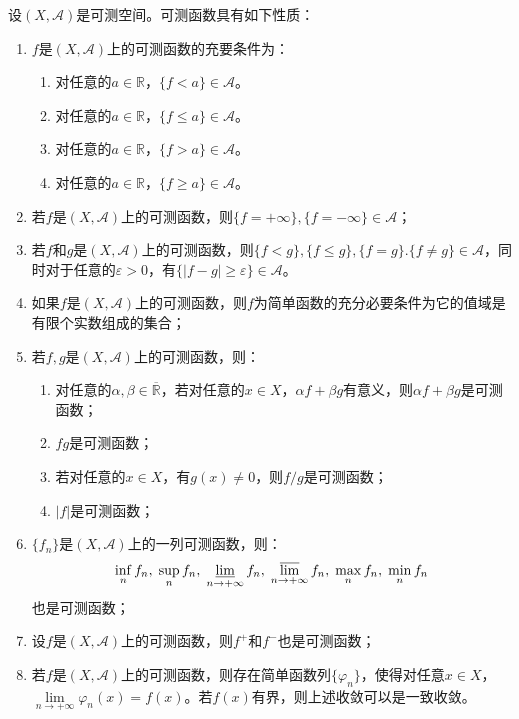 \begin{property}\label{prop:MeasurableFunction}
	设$(X,\mathscr{A})$是可测空间。可测函数具有如下性质：
	\begin{enumerate}
		\item $f$是$(X,\mathscr{A})$上的可测函数的充要条件为：
		\begin{enumerate}
			\item 对任意的$a\in\mathbb{R}$，$\{f<a\}\in\mathscr{A}$。
			\item 对任意的$a\in\mathbb{R}$，$\{f\leqslant a\}\in\mathscr{A}$。
			\item 对任意的$a\in\mathbb{R}$，$\{f>a\}\in\mathscr{A}$。
			\item 对任意的$a\in\mathbb{R}$，$\{f\geqslant a\}\in\mathscr{A}$。
		\end{enumerate}
		\item 若$f$是$(X,\mathscr{A})$上的可测函数，则$\{f=+\infty\},\{f=-\infty\}\in\mathscr{A}$；
		\item 若$f$和$g$是$(X,\mathscr{A})$上的可测函数，则$\{f<g\},\{f\leqslant g\},\{f=g\}.\{f\ne g\}\in\mathscr{A}$，同时对于任意的$\varepsilon>0$，有$\{|f-g|\geqslant\varepsilon\}\in \mathscr{A}$。
		\item 如果$f$是$(X,\mathscr{A})$上的可测函数，则$f$为简单函数的充分必要条件为它的值域是有限个实数组成的集合；
		\item 若$f,g$是$(X,\mathscr{A})$上的可测函数，则：
		\begin{enumerate}
			\item 对任意的$\alpha,\beta\in\overline{\mathbb{R}}$，若对任意的$x\in X$，$\alpha f+\beta g$有意义，则$\alpha f+\beta g$是可测函数；
			\item $fg$是可测函数；
			\item 若对任意的$x\in X$，有$g(x)\ne0$，则$f/g$是可测函数；
			\item $|f|$是可测函数；
		\end{enumerate}
		\item $\{f_n\}$是$(X,\mathscr{A})$上的一列可测函数，则：
		\begin{equation*}
			\inf_nf_n,\;\sup_nf_n,\;
			\varliminf_{n\to+\infty}f_n,\;\varlimsup_{n\to+\infty}f_n,\;\max_nf_n,\;\min_nf_n
		\end{equation*}
		也是可测函数；
		\item 设$f$是$(X,\mathscr{A})$上的可测函数，则$f^+$和$f^-$也是可测函数；
		\item 若$f$是$(X,\mathscr{A})$上的可测函数，则存在简单函数列$\{\varphi_n\}$，使得对任意$x\in X$，$\lim\limits_{n\to+\infty}\varphi_n(x)=f(x)$。若$f(x)$有界，则上述收敛可以是一致收敛。
	\end{enumerate}
\end{property}
